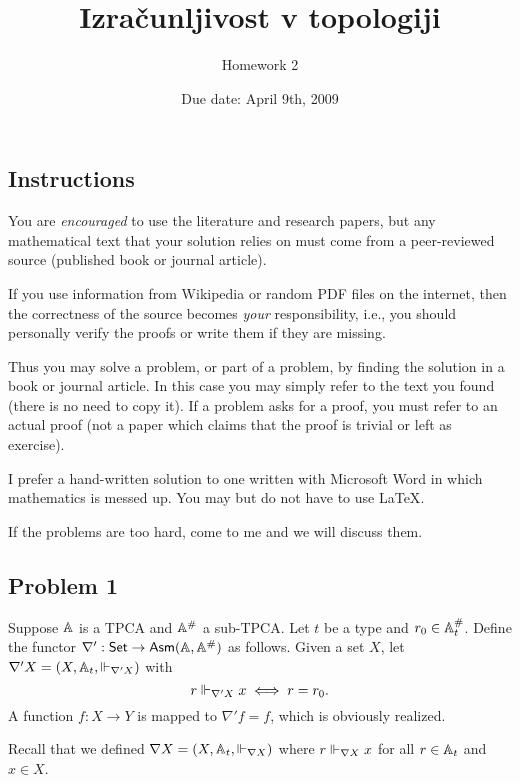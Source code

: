 \documentclass[a4paper,11pt]{article}
\begin{document}
\title{Izračunljivost v topologiji}
\author{Homework 2}
\date{Due date: April 9th, 2009}

\maketitle


\subsection*{Instructions}

You are \emph{encouraged} to use the literature and research papers,
but any mathematical text that your solution relies on must come from
a peer-reviewed source (published book or journal article).

If you use information from Wikipedia or random PDF files on the
internet, then the correctness of the source becomes \emph{your}
responsibility, i.e., you should personally verify the proofs or write
them if they are missing.

Thus you may solve a problem, or part of a problem, by finding the
solution in a book or journal article. In this case you may simply
refer to the text you found (there is no need to copy it). If a
problem asks for a proof, you must refer to an actual proof (not a
paper which claims that the proof is trivial or left as exercise).

I prefer a hand-written solution to one written with Microsoft Word in
which mathematics is messed up. You may but do not have to use
{\LaTeX}.

If the problems are too hard, come to me and we will discuss them.

\subsection*{Problem 1}

Suppose $\AA$ is a TPCA and $\compAA$ a sub-TPCA. Let $t$ be a type
and $r_0 \in \compAtyp{t}$. Define the functor $\nabla' : \Set \to
\AsmA$ as follows. Given a set $X$, let $\nabla' X = (X, \Atyp{t},
{\rz_{\nabla' X}})$ with
%
\begin{equation*}
  r \rz_{\nabla' X} x \iff r = r_0.
\end{equation*}
%
A function $f : X \to Y$ is mapped to $\nabla' f = f$, which is
obviously realized.

Recall that we defined $\nabla X = (X, \Atyp{t}, {\rz_{\nabla X}})$
where $r \rz_{\nabla X} x$ for all $r \in \Atyp{t}$ and $x \in X$.
\end{document}
